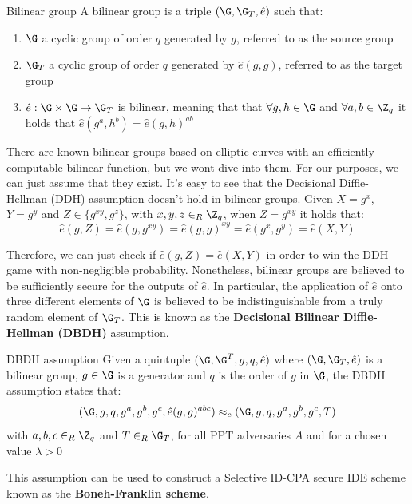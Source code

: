 \documentclass[a4paper, 12pt]{report}
\begin{document}
    \begin{frameddefn}{Bilinear group}
        A bilinear group is a triple $(\G, \G_T, \hat e)$ such that:
        \begin{enumerate}
            \item $\G$ a cyclic group of order $q$ generated by $g$, referred to as the source group
            \item $\G_T$ a cyclic group of order $q$ generated by $\hat e(g,g)$, referred to as the target group
            \item $\hat e : \G \times \G \to \G_T$ is bilinear, meaning that  that $\forall g,h \in \G$ and $\forall a,b \in \Z_q$ it holds that $\hat e(g^a, h^b) = \hat e(g,h)^{ab}$
        \end{enumerate}
    \end{frameddefn}

    There are known bilinear groups based on elliptic curves with an efficiently computable bilinear function, but we wont dive into them. For our purposes, we can just assume that they exist. It's easy to see that the Decisional Diffie-Hellman (DDH) assumption doesn't hold in bilinear groups. Given $X = g^x$, $Y = g^y$ and $Z \in \{g^{xy}, g^z\}$, with $x,y,z \in_R \Z_q$, when $Z = g^{xy}$ it holds that:
    \[\hat e (g, Z) = \hat e (g, g^{xy}) = \hat e (g, g)^{xy} = \hat e(g^x, g^y) = \hat e (X, Y)\]

    Therefore, we can just check if $\hat e(g,Z) = \hat e (X,Y)$ in order to win the DDH game with non-negligible probability. Nonetheless, bilinear groups are believed to be sufficiently secure for the outputs of $\hat e$. In particular, the application of $\hat e$ onto three different elements of $\G$ is believed to be indistinguishable from a truly random element of $\G_T$. This is known as the \textbf{Decisional Bilinear Diffie-Hellman (DBDH)} assumption.

    \begin{framedass}{DBDH assumption}
        Given a quintuple $(\G,\G^T,g,q, \hat e)$ where $(\G, \G_T, \hat e)$ is a bilinear group, $g \in \G$ is a generator and $q$ is the order of $g$ in $\G$, the DBDH assumption states that:
        \[(\G,g,q,g^a,g^b,g^c, \hat e(g,g)^{abc}) \approx_c (\G,g,q,g^a,g^b,g^c, T)\]
        with $a,b,c \in_R \Z_q$ and $T \in_R \G_T$, for all PPT adversaries $A$ and for a chosen value $\lambda > 0$
    \end{framedass}

    This assumption can be used to construct a Selective ID-CPA secure IDE scheme known as the \textbf{Boneh-Franklin scheme}.
\end{document}
